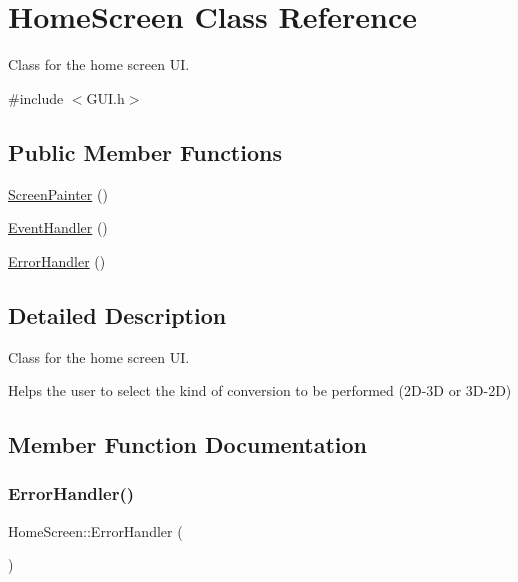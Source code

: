 \hypertarget{class_home_screen}{}\section{Home\+Screen Class Reference}
\label{class_home_screen}


Class for the home screen UI.  




{\ttfamily \#include $<$G\+U\+I.\+h$>$}

\subsection*{Public Member Functions}
\begin{DoxyCompactItemize}
\item 
\mbox{\hyperlink{class_home_screen_aab2d7fb46a2488713f38fb39a5cfc21b}{Screen\+Painter}} ()
\item 
\mbox{\hyperlink{class_home_screen_a4e7e2efcfd7caa30ce2098185a5e6009}{Event\+Handler}} ()
\item 
\mbox{\hyperlink{class_home_screen_ac0f769f5bf92706a7dceb72c23940432}{Error\+Handler}} ()
\end{DoxyCompactItemize}


\subsection{Detailed Description}
Class for the home screen UI. 

Helps the user to select the kind of conversion to be performed (2\+D-\/3D or 3\+D-\/2D) 

\subsection{Member Function Documentation}
\mbox{\label{class_home_screen_ac0f769f5bf92706a7dceb72c23940432}} 
\subsubsection{\texorpdfstring{Error\+Handler()}{ErrorHandler()}}
{\footnotesize\ttfamily Home\+Screen\+::\+Error\+Handler (\begin{DoxyParamCaption}{ }\end{DoxyParamCaption})}

